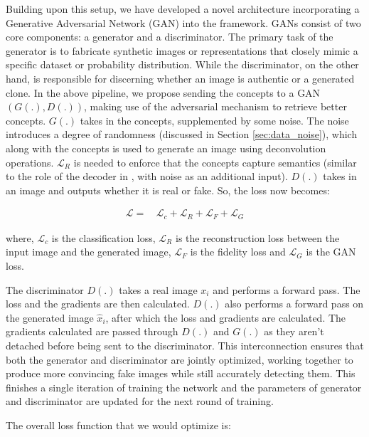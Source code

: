 \documentclass[letterpaper]{article}
\begin{document}
Building upon this setup, we have developed a novel architecture incorporating a Generative Adversarial Network (GAN) \cite{GAN} into the framework. GANs consist of two core components: a generator and a discriminator. The primary task of the generator is to fabricate synthetic images or representations that closely mimic a specific dataset or probability distribution. While the discriminator, on the other hand, is responsible for discerning whether an image is authentic or a generated clone. In the above pipeline, we propose sending the concepts to a GAN $(G(.) , D(.))$, making use of the adversarial mechanism to retrieve better concepts. $G(.)$ takes in the concepts, supplemented by some noise. The noise introduces a degree of randomness (discussed in Section \ref{sec:data_noise}), which along with the concepts is used to generate an image using deconvolution operations. $\mathcal L_R$ is needed to enforce that the concepts capture semantics (similar to the role of the decoder in \cite{Sarkar2021AFF}, with noise as an additional input). $D(.)$ takes in an image and outputs whether it is real or fake. So, the loss now becomes:


\begin{equation}
\begin{aligned}\label{eq:our_loss}
    \mathcal{L} = & \, \mathcal{L}_c + \mathcal{L}_R
    + \mathcal{L}_F + \mathcal{L}_G
\end{aligned}
\end{equation}

where, $\mathcal{L}_c$ is the classification loss, $\mathcal{L}_R$ is the reconstruction loss between the input image and the generated image, $\mathcal{L}_F$ is the fidelity loss and $\mathcal L_G$ is the GAN loss.

The discriminator $D(.)$ takes a real image $x_i$ and performs a forward pass. The loss and the gradients are then calculated. $D(.)$ also performs a forward pass on the generated image $\hat{x}_i$, after which the loss and gradients are calculated. The gradients calculated are passed through $D(.)$ and $G(.)$ as they aren't detached before being sent to the discriminator. This interconnection ensures that both the generator and discriminator are jointly optimized, working together to produce more convincing fake images while still accurately detecting them. This finishes a single iteration of training the network and the parameters of generator and discriminator are updated for the next round of training.

The overall loss function that we would optimize is:
\end{document}
